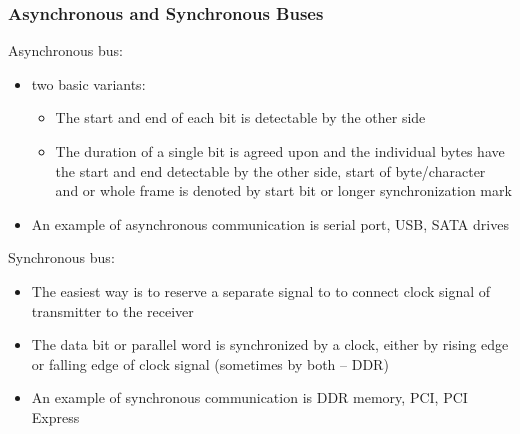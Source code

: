 \documentclass{beamer}
\begin{document}
\begin{frame}
\frametitle{Asynchronous and Synchronous Buses}

Asynchronous bus:
\begin{itemize}
\item two basic variants:
\begin{itemize}
\item The start and end of each bit is detectable by the other side
\item The duration of a single bit is agreed upon and the individual bytes have the start and end detectable by the other side, start of byte/character and or whole frame is denoted by start bit or longer synchronization mark
\end{itemize}
\item An example of asynchronous communication is serial port, USB, SATA drives
\end{itemize}


Synchronous bus:
\begin{itemize}
\item The easiest way is to reserve a separate signal to to connect clock signal of transmitter to the receiver
\item The data bit or parallel word is synchronized by a clock, either by rising edge or falling edge of clock signal (sometimes by both -- DDR)
\item An example of synchronous communication is DDR memory, PCI, PCI Express
\end{itemize}
\end{frame}
\end{document}
